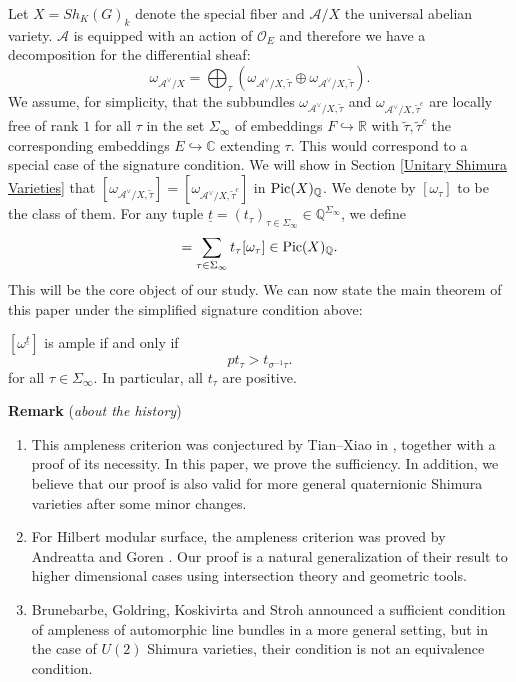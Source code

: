 \documentclass{article}
\begin{document}
Let $X=Sh_K(G)_k$ denote the special fiber and $\mathcal{A}/X$ the universal abelian variety. $\mathcal{A}$ is equipped with an action of $\mathcal{O}_E$ and therefore we have a decomposition for the differential sheaf:
\begin{equation}
	\omega_{\mathcal{A}^\vee/X}=\bigoplus_{\tau}(\omega_{\mathcal{A}^\vee/X,\tilde\tau}\oplus \omega_{\mathcal{A}^\vee/X,\tilde\tau}).
\end{equation}
We assume, for simplicity, that the subbundles $\omega_{\mathcal{A}^\vee/X,\tilde\tau}$ and $\omega_{\mathcal{A}^\vee/X,\tilde\tau^c}$ are locally free of rank $1$ for all $\tau$ in the set $\Sigma_\infty$ of embeddings $F\hookrightarrow \mathbb{R}$ with $\tilde\tau,\tilde\tau^c$ the corresponding embeddings $E\hookrightarrow \mathbb{C}$ extending $\tau$. This would correspond to a special case of the signature condition. We will show in Section \ref{Unitary Shimura Varieties} that $[\omega_{\mathcal{A}^\vee/X,\tilde\tau}]=[\omega_{\mathcal{A}^\vee/X,\tilde\tau^c}]$ in $\textnormal{Pic}(X)_{\mathbb{Q}}$. We denote by $[\omega_\tau]$ to be the class of them. For any tuple $\underline{t}=(t_\tau)_{\tau\in\Sigma_{\infty}}\in \mathbb{Q}^{\Sigma_{\infty}}$, we define
\begin{equation}
	[\omega^{\underline{t}}]=\sum_{\tau\in\Sigma_{\infty}}t_\tau[\omega_\tau]\in\textnormal{Pic}(X)_\mathbb{Q}.
\end{equation}
This will be the core object of our study. We can now state the main theorem of this paper under the simplified signature condition above:
\begin{theorem}\label{Main Theorem}
	$[\omega^{\underline{t}}]$ is ample if and only if
	\begin{equation}
		pt_\tau>t_{\sigma^{-1}\tau}.
	\end{equation}
	for all $\tau\in \Sigma_{\infty}$. In particular, all $t_\tau$ are positive.
\end{theorem}



\medskip
\noindent
\textbf{Remark} (\emph{about the history})
\begin{enumerate}
	\item This ampleness criterion was conjectured by Tian--Xiao in \citep[\S ~6]{Tian-Xiao}, together with a proof of its necessity. In this paper, we prove the sufficiency. In addition, we believe that our proof is also valid for more general quaternionic Shimura varieties after some minor changes.
	\item For Hilbert modular surface, the ampleness criterion was proved by Andreatta and Goren \citep[\S~8]{Andreatta-Goren}. Our proof is a natural generalization of their result to higher dimensional cases using intersection theory and geometric tools.
	\item Brunebarbe, Goldring, Koskivirta and Stroh \citep{BGKS} announced a sufficient condition of ampleness of automorphic line bundles in a more general setting, but in the case of $U(2)$ Shimura varieties, their condition is not an equivalence condition.
\end{enumerate}
\end{document}
